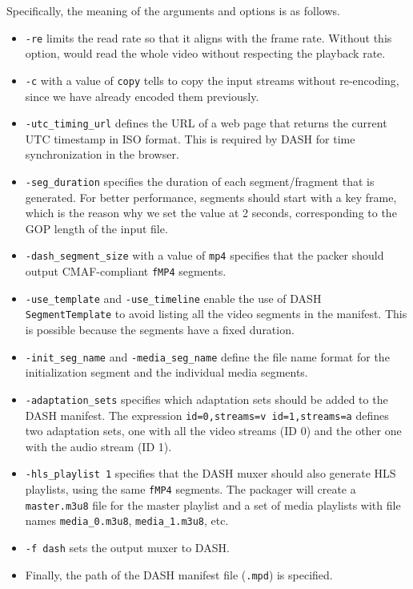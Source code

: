 Specifically, the meaning of the arguments and options is as follows.

\begin{itemize}
    \item \texttt{-re} limits the read rate so that it aligns with the frame rate. Without this option, \ffmpeg{} would read the whole video without respecting the playback rate.
    \item \texttt{-c} with a value of \texttt{copy} tells \ffmpeg{} to copy the input streams without re-encoding, since we have already encoded them previously.
    \item \texttt{-utc\_timing\_url} defines the URL of a web page that returns the current UTC timestamp in ISO format. This is required by DASH for time synchronization in the browser.
    \item \texttt{-seg\_duration} specifies the duration of each segment/fragment that is generated. For better performance, segments should start with a key frame, which is the reason why we set the value at 2 seconds, corresponding to the GOP length of the input file.
    \item \texttt{-dash\_segment\_size} with a value of \texttt{mp4} specifies that the packer should output CMAF-compliant \texttt{fMP4} segments.
    \item \texttt{-use\_template} and \texttt{-use\_timeline} enable the use of DASH \texttt{SegmentTemplate} to avoid listing all the video segments in the manifest. This is possible because the segments have a fixed duration.
    \item \texttt{-init\_seg\_name} and \texttt{-media\_seg\_name} define the file name format for the initialization segment and the individual media segments.
    \item \texttt{-adaptation\_sets} specifies which adaptation sets should be added to the DASH manifest. The expression \texttt{id=0,streams=v id=1,streams=a} defines two adaptation sets, one with all the video streams (ID 0) and the other one 
    with the audio stream (ID 1).
    \item \texttt{-hls\_playlist 1} specifies that the DASH muxer should also generate HLS playlists, using the same \texttt{fMP4} segments. The packager will create a \texttt{master.m3u8} file for the master playlist and a set of media playlists with file names \texttt{media\_0.m3u8}, \texttt{media\_1.m3u8}, etc.
    \item \texttt{-f dash} sets the \ffmpeg{} output muxer to DASH.
    \item Finally, the path of the DASH manifest file (\texttt{.mpd}) is specified.
\end{itemize}

